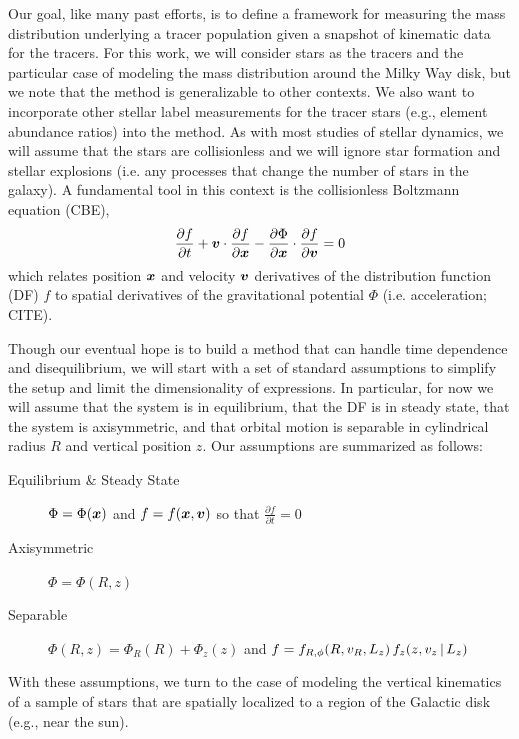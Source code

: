 Our goal, like many past efforts, is to define a framework for measuring the mass
distribution underlying a tracer population given a snapshot of kinematic data for the
tracers.
For this work, we will consider stars as the tracers and the particular case of modeling
the mass distribution around the Milky Way disk, but we note that the method is
generalizable to other contexts.
We also want to incorporate other stellar label measurements for the tracer stars (e.g.,
element abundance ratios) into the method.
As with most studies of stellar dynamics, we will assume that the stars are
collisionless and we will ignore star formation and stellar explosions (i.e. any
processes that change the number of stars in the galaxy).
A fundamental tool in this context is the collisionless Boltzmann equation (CBE),
\begin{equation}
    \frac{\partial f}{\partial t} + \boldsymbol{v} \cdot \frac{\partial f}{\partial \boldsymbol{x}} - \frac{\partial \Phi}{\partial \boldsymbol{x}} \cdot \frac{\partial f}{\partial \boldsymbol{v}} = 0
    \label{eq:cbe}
\end{equation}
which relates position $\boldsymbol{x}$ and velocity $\boldsymbol{v}$ derivatives of the distribution
function (DF) $f$ to spatial derivatives of the gravitational potential $\Phi$ (i.e.
acceleration; CITE).

Though our eventual hope is to build a method that can handle time dependence and
disequilibrium, we will start with a set of standard assumptions to simplify the setup
and limit the dimensionality of expressions.
In particular, for now we will assume that the system is in equilibrium, that the DF is
in steady state, that the system is axisymmetric, and that orbital motion is separable
in cylindrical radius $R$ and vertical position $z$.
Our assumptions are summarized as follows:
\begin{description}
    \item[Equilibrium \& Steady State] $\Phi = \Phi(\boldsymbol{x})$ and $f = f(\boldsymbol{x}, \boldsymbol{v})$
      so that $\frac{\partial f}{\partial t}=0$
    \item[Axisymmetric] $\Phi = \Phi(R, z)$
    \item[Separable] $\Phi(R, z) = \Phi_R(R) + \Phi_z(z)$ and $f = f_{R,\phi}(R, v_R, L_z) \, f_z(z, v_z \,|\, L_z)$
\end{description}
With these assumptions, we turn to the case of modeling the vertical kinematics of a
sample of stars that are spatially localized to a region of the Galactic disk (e.g.,
near the sun).



